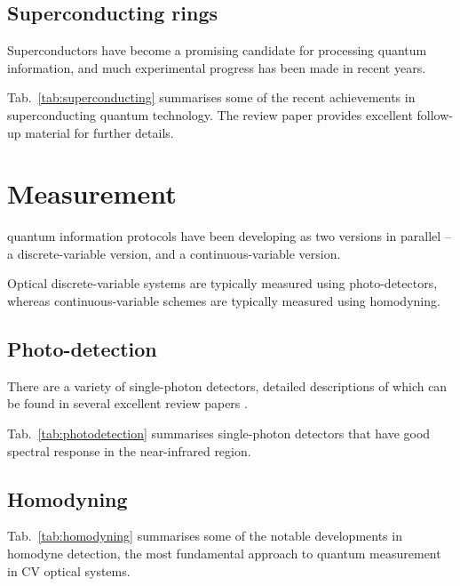 %
%

\subsection{Superconducting rings} 

Superconductors have become a promising candidate for processing quantum information, and much experimental progress has been made in recent years.

Tab.~\ref{tab:superconducting} summarises some of the recent achievements in superconducting quantum technology. The review paper \cite{bib:xiang2013hybrid} provides excellent follow-up material for further details.

%
%

\section{Measurement} 

 quantum information protocols have been developing as two versions in parallel -- a discrete-variable version, and a continuous-variable version.

Optical discrete-variable systems are typically measured using photo-detectors, whereas continuous-variable schemes are typically measured using homodyning.

%
%

\subsection{Photo-detection} 

There are a variety of single-photon detectors, detailed descriptions of which can be found in several excellent review papers \cite{bib:eisaman2011, bib:hadfield2009}.

Tab.~\ref{tab:photodetection} summarises single-photon detectors that have good spectral response in the near-infrared region.

%
%

\subsection{Homodyning}

Tab.~\ref{tab:homodyning} summarises some of the notable developments in homodyne detection, the most fundamental approach to quantum measurement in CV optical systems.

